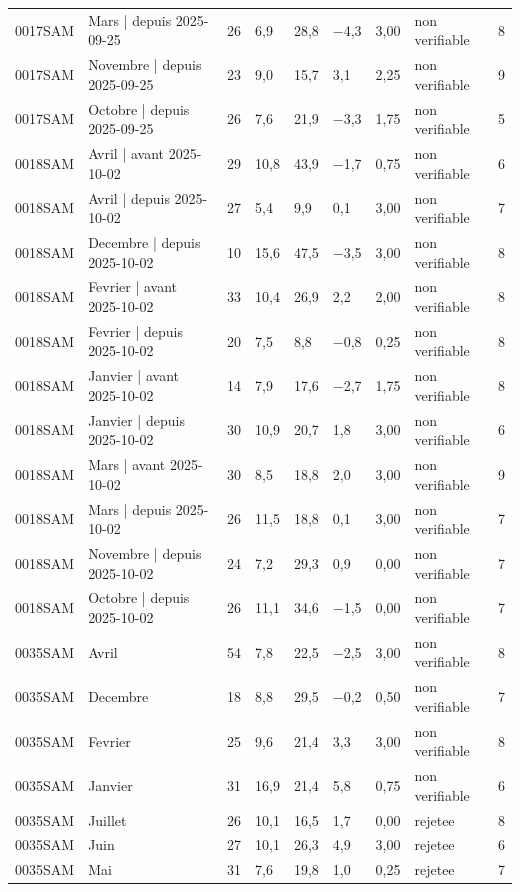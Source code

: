 \begin{table}[htbp]
\begin{tabular}{llrlllllr}
0017SAM & Mars | depuis 2025-09-25 & 26 & 6,9 & 28,8 & −4,3 & 3,00 & non verifiable & 8 \\
0017SAM & Novembre | depuis 2025-09-25 & 23 & 9,0 & 15,7 & 3,1 & 2,25 & non verifiable & 9 \\
0017SAM & Octobre | depuis 2025-09-25 & 26 & 7,6 & 21,9 & −3,3 & 1,75 & non verifiable & 5 \\
0018SAM & Avril | avant 2025-10-02 & 29 & 10,8 & 43,9 & −1,7 & 0,75 & non verifiable & 6 \\
0018SAM & Avril | depuis 2025-10-02 & 27 & 5,4 & 9,9 & 0,1 & 3,00 & non verifiable & 7 \\
0018SAM & Decembre | depuis 2025-10-02 & 10 & 15,6 & 47,5 & −3,5 & 3,00 & non verifiable & 8 \\
0018SAM & Fevrier | avant 2025-10-02 & 33 & 10,4 & 26,9 & 2,2 & 2,00 & non verifiable & 8 \\
0018SAM & Fevrier | depuis 2025-10-02 & 20 & 7,5 & 8,8 & −0,8 & 0,25 & non verifiable & 8 \\
0018SAM & Janvier | avant 2025-10-02 & 14 & 7,9 & 17,6 & −2,7 & 1,75 & non verifiable & 8 \\
0018SAM & Janvier | depuis 2025-10-02 & 30 & 10,9 & 20,7 & 1,8 & 3,00 & non verifiable & 6 \\
0018SAM & Mars | avant 2025-10-02 & 30 & 8,5 & 18,8 & 2,0 & 3,00 & non verifiable & 9 \\
0018SAM & Mars | depuis 2025-10-02 & 26 & 11,5 & 18,8 & 0,1 & 3,00 & non verifiable & 7 \\
0018SAM & Novembre | depuis 2025-10-02 & 24 & 7,2 & 29,3 & 0,9 & 0,00 & non verifiable & 7 \\
0018SAM & Octobre | depuis 2025-10-02 & 26 & 11,1 & 34,6 & −1,5 & 0,00 & non verifiable & 7 \\
0035SAM & Avril & 54 & 7,8 & 22,5 & −2,5 & 3,00 & non verifiable & 8 \\
0035SAM & Decembre & 18 & 8,8 & 29,5 & −0,2 & 0,50 & non verifiable & 7 \\
0035SAM & Fevrier & 25 & 9,6 & 21,4 & 3,3 & 3,00 & non verifiable & 8 \\
0035SAM & Janvier & 31 & 16,9 & 21,4 & 5,8 & 0,75 & non verifiable & 6 \\
0035SAM & Juillet & 26 & 10,1 & 16,5 & 1,7 & 0,00 & rejetee & 8 \\
0035SAM & Juin & 27 & 10,1 & 26,3 & 4,9 & 3,00 & rejetee & 6 \\
0035SAM & Mai & 31 & 7,6 & 19,8 & 1,0 & 0,25 & rejetee & 7 \\

\end{tabular}
\end{table}
